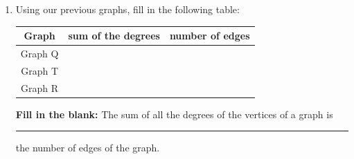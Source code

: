 \documentclass[12pt]{article}
\newcommand{\ans}[1][1in]{\rule{#1}{.5pt}}
\newcommand{\be}{\begin{enumerate}}
\newcommand{\ee}{\end{enumerate}}
\begin{document}
\begin{enumerate}
\be
\item Explain why this graph is not connected. 

\vfill

\item A \emph{connected component} is a piece of a graph that \emph{is} connected. To the right of the graph, draw the two connected components of graph R separately, with no crossing edges. (You will need to change the position of the vertices and edges!) 

\item Label each vertex with its degree.
\item How many edges does graph R have? \ans
\ee


\item Using our previous graphs, fill in the following table:

{
\renewcommand{\arraystretch}{1.5}
\begin{tabular}{c | c | c}
Graph & sum of the degrees& number of edges \\ \hline
Graph Q &  & \\ \hline
Graph T & & \\ \hline
Graph R &  & \\ \hline
\end{tabular}
}

\bigskip 

{\bf  Fill in the blank:} The sum of all the degrees of the vertices of a graph is \ans the number of edges of the graph.



\end{enumerate}
\end{document}
